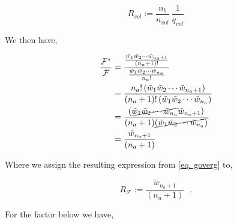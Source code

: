 \documentclass[12pt,letterpaper]{article}
\newcommand{\lr}[1]{\left( #1 \right)}
\newcommand{\fop}{\ensuremath{\mathcal{F}}}
\begin{document}
\begin{equation}
    R_{vol}:=
    		\frac{
		    n_b
		}{
		    n_{vol} 
		}
		~
    \frac{
    1
}{
    q_{vol}
}
   \label{Rvol}
\end{equation}

We then have,

\begin{align}
\label{eq. goverg}
\frac{
    \fop^{*}
}{
    \fop
}
&=
\frac{
    \frac{
        \tilde{w}_1
        \tilde{w}_2
        \cdots 
        \tilde{w}_{n_a+1}
    }{
        (n_a+1)!
    }   
}{   
    \frac{
        \tilde{w}_1
        \tilde{w}_2
        \cdots 
        \tilde{w}_{n_a}
    }{
        n_a!
    }   
}\nonumber\\
&=
\frac{
        n_a!
        \lr{
            \tilde{w}_1
            \tilde{w}_2
            \cdots 
            \tilde{w}_{n_a+1}
        }       
}{ 
        (n_a+1)!
        \lr{
            \tilde{w}_1
            \tilde{w}_2
            \cdots 
            \tilde{w}_{n_a}
            }
}\\
&=
\frac{
        \lr{
            \cancel{
                \tilde{w}_1
                \tilde{w}_2
                \cdots 
                \tilde{w}_{n_a}
            }
            \tilde{w}_{n_a+1}
        }       
}{ 
        (n_a+1)
        \cancel{
            \lr{
                \tilde{w}_1
                \tilde{w}_2
                \cdots 
                \tilde{w}_{n_a}
                }
        }
}\nonumber\\
&=
\frac{
            \tilde{w}_{n_a+1}       
}{ 
        (n_a+1)
}\nonumber
\end{align}

Where we assign the resulting expression from \ref{eq. goverg} to,

\begin{equation}
    R_{\fop}:=
    \frac{
                \tilde{w}_{n_a+1}       
    }{ 
            (n_a+1)
    }~~~\textbf{.}
   \label{Eq: RG}
\end{equation}

For the factor below we have, 
\end{document}
